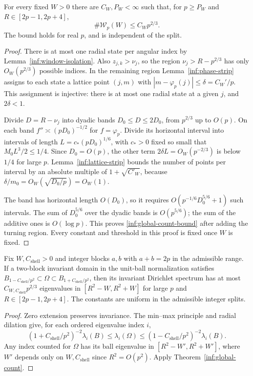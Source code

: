 \begin{theorem}\label{inf:global-count}
For every fixed $W>0$ there are $C_W,P_W<\infty$ such that, for
$p\ge P_W$ and $R\in[2p-1,2p+4]$,
\begin{equation}\label{inf:global-count-bound}
 \#\mathcal W_p(W)\le C_Wp^{2/3}.
\end{equation}
The bound holds for real $p$, and is independent of the split.
\end{theorem}
\begin{proof}
There is at most one radial state per angular index by
Lemma~\ref{inf:window-isolation}. Also $z_{j,k}>\nu_j$, so the
region $\nu_j>R-p^{2/3}$ has only $O_W(p^{2/3})$ possible indices.
In the remaining region Lemma~\ref{inf:phase-strip} assigns to each
state a lattice point $(j,m)$ with
$|m-\varphi_p(j)|\le\delta=C_W'/p$. This assignment is injective:
there is at most one radial state at a given $j$, and $2\delta<1$.

Divide $D=R-\nu_j$ into dyadic bands $D_0\le D\le2D_0$, from
$p^{2/3}$ up to $O(p)$. On each band
$f''\asymp(pD_0)^{-1/2}$ for $f=\varphi_p$. Divide its horizontal
interval into intervals of length
$L=c_*(pD_0)^{1/6}$, with $c_*>0$ fixed so small that
$M_0L^3/2\le1/4$. Since $D_0=O(p)$, the other term
$2\delta L=O_W(p^{-2/3})$ is below $1/4$ for large $p$.
Lemma~\ref{inf:lattice-strip} bounds the number of points per interval
by an absolute multiple of $1+\sqrt{C'_W}$, because
$\delta/m_0=O_W(\sqrt{D_0/p})=O_W(1)$.

The band has horizontal length $O(D_0)$, so it requires
$O(p^{-1/6}D_0^{5/6}+1)$ such intervals. The sum of $D_0^{5/6}$ over
the dyadic bands is $O(p^{5/6})$; the sum of the additive ones is
$O(\log p)$. This proves \eqref{inf:global-count-bound} after adding
the turning region. Every constant and threshold in this proof is
fixed once $W$ is fixed.
\end{proof}

\begin{corollary}\label{inf:shell-count}
Fix $W,C_{\mathrm{shell}}>0$ and integer blocks $a,b$ with
$a+b=2p$ in the admissible range. If a two-block invariant domain in the unit-ball
normalization satisfies
$B_{1-C_{\mathrm{shell}}/p^2}\subset\Omega\subset B_{1+C_{\mathrm{shell}}/p^2}$, then its invariant
Dirichlet spectrum has at most $C_{W,C_{\mathrm{shell}}}p^{2/3}$ eigenvalues in
$[R^2-W,R^2+W]$ for large $p$ and $R\in[2p-1,2p+4]$.
The constants are uniform in the admissible integer splits.
\end{corollary}
\begin{proof}
Zero extension preserves invariance. The min--max principle and radial
dilation give, for each ordered eigenvalue index $i$,
\[
 (1+C_{\mathrm{shell}}/p^2)^{-2}\lambda_i(B)
 \le\lambda_i(\Omega)\le
 (1-C_{\mathrm{shell}}/p^2)^{-2}\lambda_i(B).
\]
Any index counted for $\Omega$ has its ball eigenvalue in
$[R^2-W',R^2+W']$, where $W'$ depends only on $W,C_{\mathrm{shell}}$ since
$R^2=O(p^2)$. Apply Theorem~\ref{inf:global-count}.
\end{proof}
